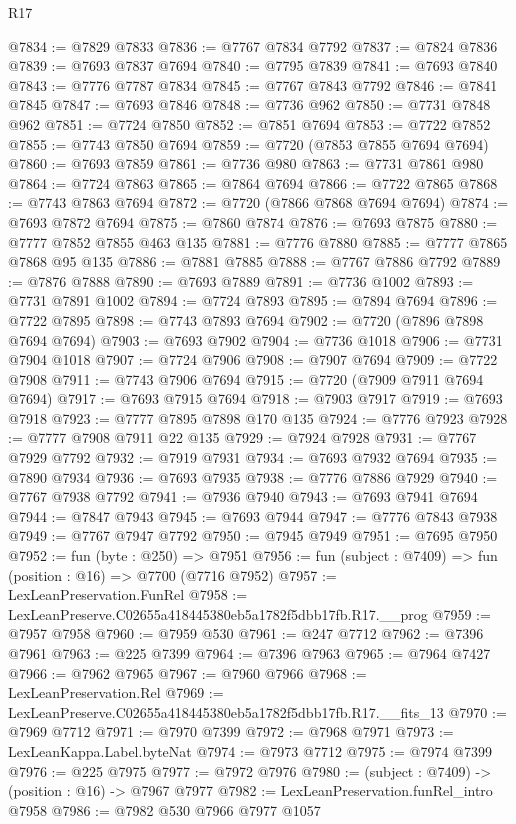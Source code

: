 \begin{lexlean}{R17}
\begin{coremodule}
@7834 := @7829 @7833
@7836 := @7767 @7834 @7792
@7837 := @7824 @7836
@7839 := @7693 @7837 @7694
@7840 := @7795 @7839
@7841 := @7693 @7840
@7843 := @7776 @7787 @7834
@7845 := @7767 @7843 @7792
@7846 := @7841 @7845
@7847 := @7693 @7846
@7848 := @7736 @962
@7850 := @7731 @7848 @962
@7851 := @7724 @7850
@7852 := @7851 @7694
@7853 := @7722 @7852
@7855 := @7743 @7850 @7694
@7859 := @7720 (@7853 @7855 @7694 @7694)
@7860 := @7693 @7859
@7861 := @7736 @980
@7863 := @7731 @7861 @980
@7864 := @7724 @7863
@7865 := @7864 @7694
@7866 := @7722 @7865
@7868 := @7743 @7863 @7694
@7872 := @7720 (@7866 @7868 @7694 @7694)
@7874 := @7693 @7872 @7694
@7875 := @7860 @7874
@7876 := @7693 @7875
@7880 := @7777 @7852 @7855 @463 @135
@7881 := @7776 @7880
@7885 := @7777 @7865 @7868 @95 @135
@7886 := @7881 @7885
@7888 := @7767 @7886 @7792
@7889 := @7876 @7888
@7890 := @7693 @7889
@7891 := @7736 @1002
@7893 := @7731 @7891 @1002
@7894 := @7724 @7893
@7895 := @7894 @7694
@7896 := @7722 @7895
@7898 := @7743 @7893 @7694
@7902 := @7720 (@7896 @7898 @7694 @7694)
@7903 := @7693 @7902
@7904 := @7736 @1018
@7906 := @7731 @7904 @1018
@7907 := @7724 @7906
@7908 := @7907 @7694
@7909 := @7722 @7908
@7911 := @7743 @7906 @7694
@7915 := @7720 (@7909 @7911 @7694 @7694)
@7917 := @7693 @7915 @7694
@7918 := @7903 @7917
@7919 := @7693 @7918
@7923 := @7777 @7895 @7898 @170 @135
@7924 := @7776 @7923
@7928 := @7777 @7908 @7911 @22 @135
@7929 := @7924 @7928
@7931 := @7767 @7929 @7792
@7932 := @7919 @7931
@7934 := @7693 @7932 @7694
@7935 := @7890 @7934
@7936 := @7693 @7935
@7938 := @7776 @7886 @7929
@7940 := @7767 @7938 @7792
@7941 := @7936 @7940
@7943 := @7693 @7941 @7694
@7944 := @7847 @7943
@7945 := @7693 @7944
@7947 := @7776 @7843 @7938
@7949 := @7767 @7947 @7792
@7950 := @7945 @7949
@7951 := @7695 @7950
@7952 := fun (byte : @250) => @7951
@7956 := fun (subject : @7409) => fun (position : @16) => @7700 (@7716 @7952)
@7957 := LexLeanPreservation.FunRel
@7958 := LexLeanPreserve.C02655a418445380eb5a1782f5dbb17fb.R17.__prog
@7959 := @7957 @7958
@7960 := @7959 @530
@7961 := @247 @7712
@7962 := @7396 @7961
@7963 := @225 @7399
@7964 := @7396 @7963
@7965 := @7964 @7427
@7966 := @7962 @7965
@7967 := @7960 @7966
@7968 := LexLeanPreservation.Rel
@7969 := LexLeanPreserve.C02655a418445380eb5a1782f5dbb17fb.R17.__fits_13
@7970 := @7969 @7712
@7971 := @7970 @7399
@7972 := @7968 @7971
@7973 := LexLeanKappa.Label.byteNat
@7974 := @7973 @7712
@7975 := @7974 @7399
@7976 := @225 @7975
@7977 := @7972 @7976
@7980 := (subject : @7409) -> (position : @16) -> @7967 @7977
@7982 := LexLeanPreservation.funRel_intro @7958
@7986 := @7982 @530 @7966 @7977 @1057

\end{coremodule}
\end{lexlean}
